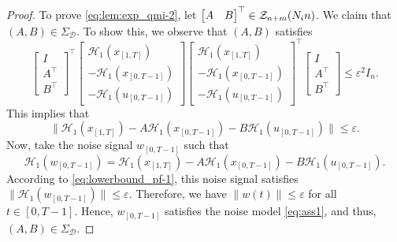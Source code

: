 \documentclass[10pt,a4paper]{amsart}
\begin{document}
\begin{proof}
To prove \eqref{eq:lem:exp_qmi-2}, let $\begin{bmatrix}
A & B
\end{bmatrix}^\top\in\mathcal{Z}_{n+m}(N_\textup{in})$. We claim that $(A,B)\in\Sigma_\mathcal{D}$. To show this, we observe that $(A,B)$ satisfies 
\begin{equation}
\label{eq:lem:exp_qmi_pf-4}
\begin{bmatrix}
I \\ A^\top \\ B^\top
\end{bmatrix}^{\!\top}\!\!\begin{bmatrix}
\mathcal{H}_1(x_{[1,T]}) \\
-\mathcal{H}_1(x_{[0,T-1]}) \\
-\mathcal{H}_1(u_{[0,T-1]})
\end{bmatrix}\!\!\begin{bmatrix}
\mathcal{H}_1(x_{[1,T]}) \\
-\mathcal{H}_1(x_{[0,T-1]}) \\
-\mathcal{H}_1(u_{[0,T-1]})
\end{bmatrix}^{\!\top}\!\!\begin{bmatrix}
I \\ A^\top \\ B^\top
\end{bmatrix} \leq  \varepsilon^2 I_n.
\end{equation}
This implies that
\begin{equation}
\label{eq:lowerbound_pf-1}
\|\mathcal{H}_1(x_{[1,T]})-A\mathcal{H}_1(x_{[0,T-1]})-B\mathcal{H}_1(u_{[0,T-1]})\|\leq \varepsilon.
\end{equation} 
Now, take the noise signal $w_{[0,T-1]}$ such that
\begin{equation}
\label{eq:lowerbound_pf-2}
\mathcal{H}_1(w_{[0,T-1]})\!=\!\mathcal{H}_1(x_{[1,T]})-A\mathcal{H}_1(x_{[0,T-1]})-B\mathcal{H}_1(u_{[0,T-1]}).
\end{equation}
According to \eqref{eq:lowerbound_pf-1}, this noise signal satisfies $\|\mathcal{H}_1(w_{[0,T-1]})\|\leq\varepsilon$. Therefore, we have $\|w(t)\|\leq\varepsilon$ for all $t\in[0,T-1]$. Hence, $w_{[0,T-1]}$ satisfies the noise model \eqref{eq:ass1}, and thus, $(A,B)\in\Sigma_\mathcal{D}$. 


\end{proof}
\end{document}
